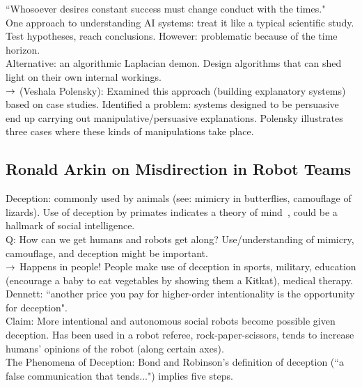 ``Whosoever desires constant success must change conduct with the times."  \\

One approach to understanding AI systems: treat it like a typical scientific study. Test hypotheses, reach conclusions. However: problematic because of the time horizon.  \\

Alternative: an algorithmic Laplacian demon. Design algorithms that can shed light on their own internal workings. \\

$\rightarrow$ (Veshala Polensky): Examined this approach (building explanatory systems) based on case studies. Identified a problem: systems designed to be persuasive end up carrying out manipulative/persuasive explanations. Polensky illustrates three cases where these kinds of manipulations take place.


\spacerule

\subsection{Ronald Arkin on Misdirection in Robot Teams}

Deception: commonly used by animals (see: mimicry in butterflies, camouflage of lizards). Use of deception by primates indicates a theory of mind~\cite{byrne1990machiavellian}, could be a hallmark of social intelligence. \\

Q: How can we get humans and robots get along? Use/understanding of mimicry, camouflage, and deception might be important. \\

$\rightarrow$ Happens in people! People make use of deception in sports, military, education (encourage a baby to eat vegetables by showing them a Kitkat), medical therapy. \\

Dennett: ``another price you pay for higher-order intentionality is the opportunity for deception". \\

Claim: More intentional and autonomous social robots become possible given deception. Has been used in a robot referee, rock-paper-scissors, tends to increase humans' opinions of the robot (along certain axes). \\

The Phenomena of Deception: Bond and Robinson's definition of deception (``a false communication that tends...") implies five steps. \\

